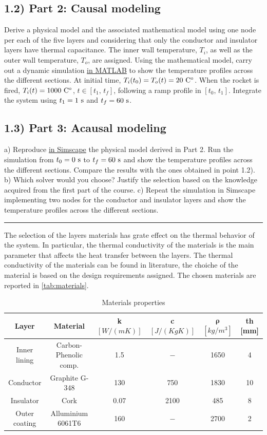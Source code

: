 \documentclass[11pt,a4paper,oneside]{article}
\begin{document}
\subsection*{1.2) Part 2: Causal modeling}
Derive a physical model and the associated mathematical model using one node per each of the five layers and considering that only the conductor and insulator layers have thermal capacitance. The inner wall temperature, $T_i$, as well as the outer wall temperature, $T_o$, are assigned.
Using the mathematical model, carry out a dynamic simulation \underline{in MATLAB} to show the temperature profiles across the different sections. At initial time, $T_i(t_0)=T_o(t) = 20\ {\rm C^\circ}$. When the rocket is fired, $T_i(t) = 1000\ {\rm C^\circ}$, $t\in[t_1,\,t_f]$, following a ramp profile in $[t_0,\,t_1]$. Integrate the system using $t_1 = 1\ {\rm s}$ and $t_f = 60\ {\rm s}$.

\subsection*{1.3) Part 3: Acausal modeling}
a) Reproduce \underline{in Simscape} the physical model derived in Part 2. Run the simulation from $t_0 = 0\ {\rm s}$ to $t_f = 60\ {\rm s}$ and show the temperature profiles across the different sections. Compare the results with the ones obtained in point 1.2). 
b) Which solver would you choose? Justify the selection based on the knowledge acquired from the first part of the course.
c) Repeat the simulation in Simscape implementing two nodes for the conductor and insulator layers and show the temperature profiles across the different sections.
\medskip

\medskip \hrule \medskip
{}

The selection of the layers materials has grate effect on the thermal behavior of the system. 
In particular, the thermal conductivity of the materials is the main parameter that affects 
the heat transfer between the layers. The thermal conductivity of the materials can be found 
in literature, the choiche of the material is based on the design requirements assigned. 
The chosen materials are reported in \autoref{tab:materials}.


\begin{table}[h!]
    \centering
    \begin{tabular}{ |c|c|c|c|c|c| }
        \hline
    \textbf{Layer} & \textbf{Material} & \textbf{k} $[W/(mK)]$& \textbf{c} $[J/(KgK)]$& $\mathbf{\rho}$ $[kg/m^3]$ & \textbf{th} [mm] \\
    \hline\hline
    Inner lining & Carbon-Phenolic comp. & 1.5 & $-$ & 1650 & 4\\ \hline
    Conductor & Graphite G-348 & 130 & 750 & 1830 & 10\\  \hline
    Insulator & Cork & 0.07 & 2100 & 485 & 8\\ \hline
    Outer coating & Alluminium 6061T6 & 160 & $-$ & 2700 & 2\\ \hline  
    \end{tabular}\caption{Materials properties}\label{tab:materials}
\end{table}
\end{document}
